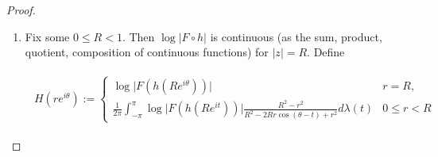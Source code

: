 \begin{proof}
\begin{enumerate}[label = \textbf{(\roman*.)}]
	Since $2i \neq 0$, $\psi$ is a linear fractional transformation (see \cite[279]{rudin:rc_analysis:1987}) with

	\begin{equation}
		\psi^{-1}(z) = \frac{z - i}{z + i}
	\end{equation}

	Therefore $\psi$ maps the unit circle $D$ onto the upper half plane. The principal value of $\log z$ denoted by $\Log z$ is defined by 

	\begin{equation}
		\Log z := \log \vert z \vert + i \Arg z \qquad z \neq 0
	\end{equation}

where $-\pi < \mathrm{Arg} z \leqslant \pi$ is the principal value of the argument of $z \neq 0$.  We see that $\pi i h(z)$ maps the upper half plane onto the strip $\mathbb{R} \times ]0,\pi[$. Thus $h(z)$ maps the unit circle $D$ onto the strip $]0,1[ \times \mathbb{R}$. By

\begin{equation}
	h'(z) = \frac{2}{\pi i} \frac{1}{1 - z}
	\label{eq:h_diff}
\end{equation}

we see that $h$ is a holomorphic function on $D$. By composition, $F \circ h$ is holomorphic on $D$ and thus by \cite[336]{rudin:rc_analysis:1987} $\log\vert F \circ h \vert$ is subharmonic on $D$. It is easy to verify, that 

\begin{equation}
	h^{-1}(z) = \frac{e^{\pi i z} - i}{e^{\pi i z} + i}
	\label{eq:h_inv}
\end{equation}
 on the unit strip $S$.\\

 \item Fix some $0 \leqslant R < 1$. Then $\log\vert F \circ h \vert$ is continuous (as the sum, product, quotient, composition of continuous functions) for $\vert z \vert = R$. Define 

\begin{gather*}
	\begin{aligned}
		H(re^{i\theta}):= \begin{cases}
			\displaystyle
			\log \vert F(h(Re^{i\theta}))\vert & r = R,\\
			\displaystyle
			\frac{1}{2\pi} \int_{-\pi}^\pi \log\vert F(h(Re^{it}))\vert \frac{R^2 - r^2}{R^2 - 2Rr\cos(\theta - t) + r^2} d\lambda(t) & 0 \leqslant r < R
	\end{cases}
	\end{aligned}
\end{gather*}


\end{enumerate}
\end{proof}

